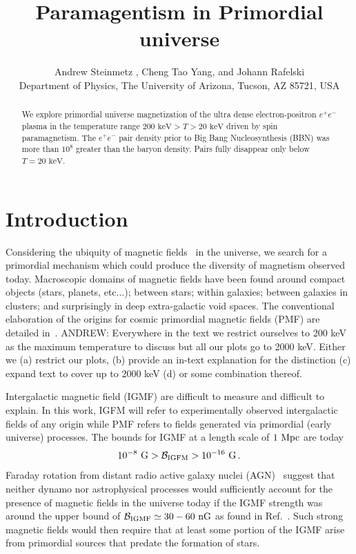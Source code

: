 \documentclass[a4paper]{article}
\title{\boldmath Paramagentism in Primordial universe}
\author{Andrew Steinmetz\orc{\orcC}%
, Cheng Tao Yang\orc{\orcB}, and Johann Rafelski\orc{\orcA}\\ Department of Physics, The University of Arizona, Tucson, AZ 85721, USA}
\newcommand*{\keV}{\text{ keV}}
\newcommand*{\xred}{\color{red}}
\newcommand*{\xblue}{\color{blue}}
\begin{document}
\maketitle

\begin{abstract}
    {\xblue We explore primordial universe magnetization of the ultra dense electron-positron $e^{+}e^{-}$ plasma in the temperature range $200\keV>T>20\keV$ driven by spin paramagnetism.} The $e^{+}e^{-}$ pair density {\xblue prior to Big Bang Nucleosynthesis (BBN)} was more than $10^{8}$ greater than the baryon density. Pairs fully disappear only below $T=20\keV$. 
\end{abstract}


\section{Introduction}
\label{sec:introduction}
\noindent  
Considering the ubiquity of magnetic fields~\cite{giovannini2003magnetized,kronberg1994extragalactic} in the universe, we search for a primordial mechanism which could produce {\xblue the diversity of magnetism observed today.} Macroscopic domains of magnetic fields have been found around compact objects (stars, planets, etc...); between stars; within galaxies; between galaxies in clusters; and surprisingly in deep extra-galactic void spaces. The conventional elaboration of the origins for cosmic  primordial magnetic fields (PMF) are detailed in~\cite{gaensler2004origin,durrer2013cosmological,batista2021gammaray}. {\xred ANDREW: Everywhere in the text we restrict ourselves to 200 keV as the maximum temperature to discuss but all our plots go to 2000 keV. Either we (a) restrict our plots, (b) provide an in-text explanation for the distinction (c) expand text to cover up to 2000 keV (d) or some combination thereof.}

Intergalactic magnetic field (IGMF) are  difficult to measure and difficult to explain. {\xblue In this work, IGFM will refer to experimentally observed intergalactic fields of any origin while PMF refers to fields generated via primordial (early universe) processes.} The bounds for IGMF at a length scale of $1{\rm\ Mpc}$ are today~\cite{neronov2010evidence,taylor2011extragalactic,pshirkov2015new,jedamzik2019stringent,vernstrom2021discovery}
\begin{align}
    \label{igmf}
    10^{-8}{\rm\ G}>\mathcal{B}_{\rm IGFM}>10^{-16}{\rm\ G}\,.
\end{align}
Faraday rotation from distant radio active galaxy nuclei (AGN)~\cite{pomakov2022redshift} suggest that neither dynamo nor astrophysical processes would sufficiently account for the presence of magnetic fields in the universe today if the IGMF strength was around the upper bound of ${\cal B}_{\rm IGMF}\simeq30-60{\rm\ nG}$ as found in Ref.~\cite{vernstrom2021discovery}. Such strong magnetic fields would then require that at least some portion of the IGMF arise from primordial sources that predate the formation of stars.
\end{document}
